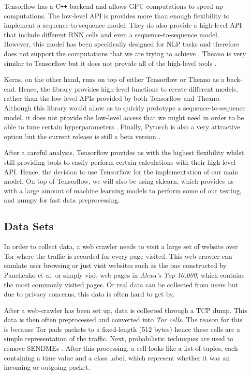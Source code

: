 Tensorflow has a C\texttt{++} backend and allows GPU computations to speed up computations.
The low-level API is provides more than enough flexibility to implement a sequence-to-sequence model.
They do also provide a high-level API that include different RNN cells and even a sequence-to-sequence model.
However, this model has been specifically designed for NLP tasks and therefore does not support the computations that we are trying to achieve \cite{tensorflow}.
Theano is very similar to Tensorflow but it does not provide all of the high-level tools \cite{theano}.

Keras, on the other hand, runs on top of either Tensorflow or Theano as a back-end.
Hence, the library provides high-level functions to create different models, rather than the low-level APIs provided by both Tensorflow and Theano.
Although this library would allow us to quickly prototype a sequence-to-sequence model, it does not provide the low-level access that we might need in order to be able to tune certain hyperparameters \cite{keras}.
Finally, Pytorch is also a very attractive option but the current release is still a beta version \cite{torch}.

After a careful analysis, Tensorflow provides us with the highest flexibility whilst still providing tools to easily perform certain calculations with their high-level API.
Hence, the decision to use Tensorflow for the implementation of our main model.
On top of Tensorflow, we will also be using sklearn, which provides us with a large amount of machine learning models to perform some of our testing, and numpy for fast data preprocessing.

\subsection{Data Sets}

In order to collect data, a web crawler needs to visit a large set of website over Tor where the traffic is recorded for every page visited.
This web crawler can emulate user browsing or just visit websites such as the one constructed by Panchenko et al. \cite{panchenko2} or simply visit web pages in \textit{Alexa’s Top 10,000}, which contains the most commonly visited pages.
Or real data can be collected from users but due to privacy concerns, this data is often hard to get by.

After a web-crawler has been set up, data is collected through a TCP dump.
This data is then often preprocessed and converted into \textit{Tor cells}.
The reason for this is because Tor pads packets to a fixed-length (512 bytes) \cite{tor_project} hence these cells are a simple representation of the traffic.
Next, probabilistic techniques are used to remove SENDMEs \cite{wang_goldberg_2013}.
After this processing, a cell looks like a list of tuples, each containing a time value and a class label, which represent whether it was an incoming or outgoing packet.

